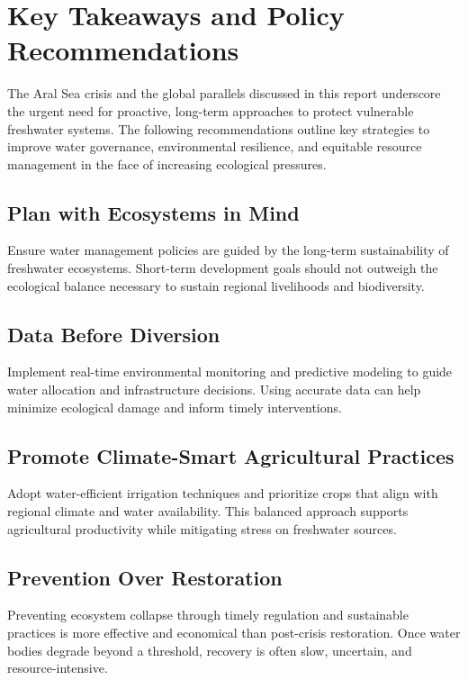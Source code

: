 

\chapter[Key Takeaways and Policy Recommendations]{Key Takeaways and Policy Recommendations}
\label{cp:key-takeaways}

\vspace{.935em}

The Aral Sea crisis and the global parallels discussed in this report underscore the urgent need for proactive, long-term approaches to protect vulnerable freshwater systems. The following recommendations outline key strategies to improve water governance, environmental resilience, and equitable resource management in the face of increasing ecological pressures. 

\section{Plan with Ecosystems in Mind }
    Ensure water management policies are guided by the long-term sustainability of freshwater ecosystems. Short-term development goals should not outweigh the ecological balance necessary to sustain regional livelihoods and biodiversity. 

\section{Data Before Diversion }
    Implement real-time environmental monitoring and predictive modeling to guide water allocation and infrastructure decisions. Using accurate data can help minimize ecological damage and inform timely interventions. 

\section{Promote Climate-Smart Agricultural Practices }
    Adopt water-efficient irrigation techniques and prioritize crops that align with regional climate and water availability. This balanced approach supports agricultural productivity while mitigating stress on freshwater sources. 

\section{Prevention Over Restoration }
    Preventing ecosystem collapse through timely regulation and sustainable practices is more effective and economical than post-crisis restoration. Once water bodies degrade beyond a threshold, recovery is often slow, uncertain, and resource-intensive. 

